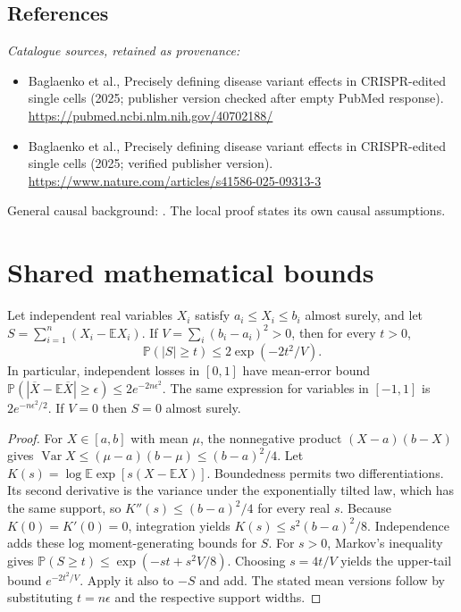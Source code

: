 \documentclass[11pt]{article}
\begin{document}
\subsection{References}
\noindent\emph{Catalogue sources, retained as provenance:}
\begin{itemize}
\item Baglaenko et al., Precisely defining disease variant effects in CRISPR-edited single cells (2025; publisher version checked after empty PubMed response). \url{https://pubmed.ncbi.nlm.nih.gov/40702188/}
\item Baglaenko et al., Precisely defining disease variant effects in CRISPR-edited single cells (2025; verified publisher version). \url{https://www.nature.com/articles/s41586-025-09313-3}
\end{itemize}
\noindent General causal background: \cite{pearl}. The local proof states its own causal assumptions.




\section{Shared mathematical bounds}\label{app:bounds}
\begin{lemma}\label{lem:bounded}
Let independent real variables $X_i$ satisfy $a_i\leq X_i\leq b_i$ almost surely,
and let $S=\sum_{i=1}^n(X_i-\mathbb{E} X_i)$. If
$V=\sum_i(b_i-a_i)^2>0$, then for every $t>0$,
\[
 \mathbb{P}(|S|\geq t)\leq 2\exp(-2t^2/V).
\]
In particular, independent losses in $[0,1]$ have mean-error bound
$\mathbb{P}(|\overline X-\mathbb{E}\overline X|\geq\epsilon)
\leq2e^{-2n\epsilon^2}$. The same expression for variables in $[-1,1]$
is $2e^{-n\epsilon^2/2}$. If $V=0$ then $S=0$ almost surely.
\end{lemma}
\begin{proof}
For $X\in[a,b]$ with mean $\mu$, the nonnegative product
$(X-a)(b-X)$ gives
$\operatorname{Var} X\leq(\mu-a)(b-\mu)\leq(b-a)^2/4$.
Let $K(s)=\log\mathbb{E}\exp[s(X-\mathbb{E} X)]$.
Boundedness permits two differentiations. Its second derivative is the variance
under the exponentially tilted law, which has the same support, so
$K''(s)\leq(b-a)^2/4$ for every real $s$.
Because $K(0)=K'(0)=0$, integration yields
$K(s)\leq s^2(b-a)^2/8$.
Independence adds these log moment-generating bounds for $S$.
For $s>0$, Markov's inequality gives
$\mathbb{P}(S\geq t)\leq\exp(-st+s^2V/8)$.
Choosing $s=4t/V$ yields the upper-tail bound $e^{-2t^2/V}$.
Apply it also to $-S$ and add. The stated mean versions follow by substituting
$t=n\epsilon$ and the respective support widths.
\end{proof}
\end{document}
